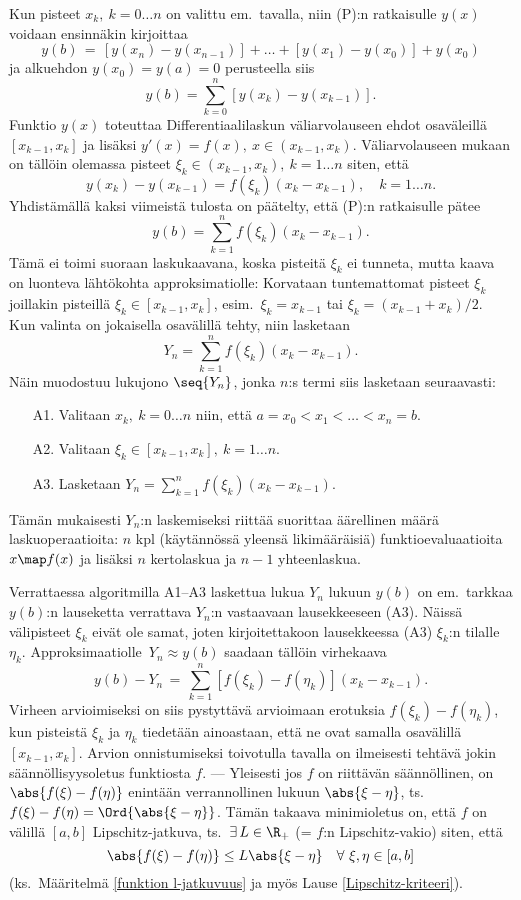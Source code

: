 Kun pisteet $x_k,\ k = 0 \ldots n$ on valittu em.\ tavalla, niin (P):n ratkaisulle $y(x)$
voidaan ensinnäkin kirjoittaa
\[
y(b) \,=\, [y(x_n)-y(x_{n-1})]+ \ldots +[y(x_1)-y(x_0)]+y(x_0)
\]
ja alkuehdon $y(x_0)=y(a)=0$ perusteella siis
\[
y(b)=\sum_{k=0}^n [y(x_k)-y(x_{k-1})].
\]
Funktio $y(x)$ toteuttaa Differentiaalilaskun väliarvolauseen ehdot osaväleillä $\quad$
$[x_{k-1},x_k]$ ja lisäksi $y'(x)=f(x),\ x\in(x_{k-1},x_k)$. Väliarvolauseen mukaan on tällöin
olemassa pisteet $\xi_k\in(x_{k-1},x_k),\ k=1 \ldots n$ siten, että
\[
y(x_k)-y(x_{k-1})=f(\xi_k)(x_k-x_{k-1}), \quad k=1\ldots n.
\]
Yhdistämällä kaksi viimeistä tulosta on päätelty, että (P):n ratkaisulle pätee
\[
y(b)=\sum_{k=1}^nf(\xi_k)(x_k-x_{k-1}).
\]
Tämä ei toimi suoraan laskukaavana, koska pisteitä $\xi_k$ ei tunneta, mutta kaava on
luonteva lähtökohta approksimatiolle: Korvataan tuntemattomat pisteet $\xi_k$ joillakin
 pisteillä $\xi_k\in[x_{k-1},x_k]$, esim.\ $\xi_k=x_{k-1}$ tai
$\xi_k=(x_{k-1}+x_k)/2$. Kun valinta on jokaisella osavälillä tehty, niin lasketaan
\[
Y_n = \sum_{k=1}^nf(\xi_k)(x_k-x_{k-1}).
\]
Näin muodostuu lukujono $\seq{Y_n}$, jonka $n$:s termi siis lasketaan seuraavasti:
\begin{itemize}
\item[A1.] Valitaan  $x_k,\ k=0 \ldots n$ niin, että
           $a=x_0 < x_1 < \ldots < x_n=b$. %
\item[A2.] Valitaan  $\xi_k\in[x_{k-1},x_k],\ k=1 \ldots n$.
\item[A3.] Lasketaan $Y_n=\sum_{k=1}^n f(\xi_k)(x_k-x_{k-1})$.
\end{itemize}
Tämän mukaisesti $Y_n$:n laskemiseksi riittää suorittaa äärellinen määrä laskuoperaatioita:
$n$ kpl (käytännössä yleensä likimääräisiä) funktioevaluaatioita $x \map f(x)$ ja lisäksi
$n$ kertolaskua ja $n-1$ yhteenlaskua.

Verrattaessa algoritmilla A1--A3 laskettua lukua $Y_n$ lukuun $y(b)$ on em.\ tarkkaa
$y(b)$:n lauseketta verrattava $Y_n$:n vastaavaan lausekkeeseen (A3). Näissä välipisteet
$\xi_k$ eivät ole samat, joten kirjoitettakoon lausekkeessa (A3) $\xi_k$:n tilalle $\eta_k$.
Approksimaatiolle $\,Y_n \approx y(b)$ saadaan tällöin virhekaava
\[
y(b)-Y_n \,=\, \sum_{k=1}^n[f(\xi_k)-f(\eta_k)](x_k-x_{k-1}).
\]
Virheen arvioimiseksi on siis pystyttävä arvioimaan erotuksia $f(\xi_k)-f(\eta_k)$, kun
pisteistä $\xi_k$ ja $\eta_k$ tiedetään ainoastaan, että ne ovat samalla osavälillä
$[x_{k-1},x_k]$. Arvion onnistumiseksi toivotulla tavalla on ilmeisesti tehtävä jokin
säännöllisyys\-oletus funktiosta $f$. --- Yleisesti jos $f$ on riittävän säännöllinen, on
$\abs{f(\xi)-f(\eta)}$ enintään verrannollinen lukuun $\abs{\xi-\eta}$, ts.\
$f(\xi)-f(\eta)=\Ord{\abs{\xi-\eta}}$. Tämän takaava minimioletus on, että $f$ on välillä
$[a,b]$ Lipschitz-jatkuva, ts.\ $\exists\,L\in\R_+$ (= $f$:n Lipschitz-vakio) siten, että
\[
\abs{f(\xi)-f(\eta)} \le L \abs{\xi-\eta} \quad \forall\ \xi,\eta\in[a,b]
\]
(ks.\ Määritelmä \ref{funktion l-jatkuvuus} ja myös Lause \ref{Lipschitz-kriteeri}).

